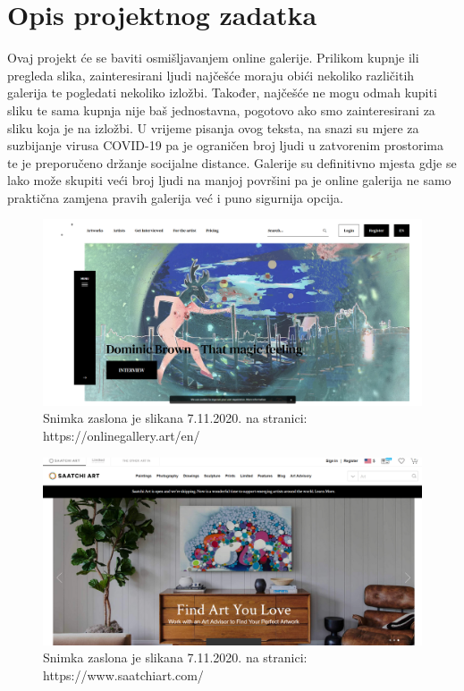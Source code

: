 \chapter{Opis projektnog zadatka}
		
		{Ovaj projekt će se baviti osmišljavanjem online galerije. Prilikom kupnje ili pregleda slika, zainteresirani ljudi najčešće moraju obići nekoliko različitih galerija te pogledati nekoliko  izložbi. Također, najčešće ne mogu odmah kupiti sliku te sama kupnja nije baš jednostavna, pogotovo ako smo zainteresirani za sliku koja je na izložbi. 
		U vrijeme pisanja ovog  teksta, na snazi su mjere za suzbijanje virusa COVID-19 pa je ograničen broj ljudi u zatvorenim prostorima te je preporučeno držanje socijalne distance. Galerije su definitivno mjesta gdje se lako može skupiti veći broj ljudi na manjoj površini pa je online galerija ne samo praktična zamjena pravih galerija već i puno sigurnija opcija. 	
		\vspace{10mm} 
}
		\graphicspath{ {./slike/} }
				\begin{figure}[H]

					\includegraphics[width=\textwidth,height=\textheight,keepaspectratio]{onlinegallery_art}
					\caption{Snimka zaslona je slikana 7.11.2020. na  stranici: \newline https://onlinegallery.art/en/ }

				\end{figure}
		\graphicspath{ {./slike/} }
				\begin{figure}[H]

					\includegraphics[width=\textwidth,height=\textheight,keepaspectratio]{saatchiart_com}
					\caption{Snimka zaslona je slikana 7.11.2020. na  stranici: \newline https://www.saatchiart.com/}

				\end{figure}	
		
